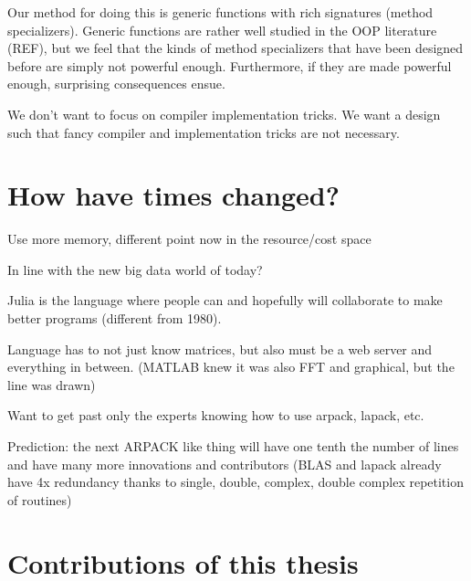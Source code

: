 Our method for doing this is generic functions with rich signatures
(method specializers). Generic functions are rather well studied in the
OOP literature (REF), but we feel that the kinds of method specializers
that have been designed before are simply not powerful enough.
Furthermore, if they are made powerful enough, surprising consequences
ensue.


We don't want to focus on compiler implementation tricks. We want a
design such that fancy compiler and implementation tricks are not necessary.


\section{How have times changed?}

Use more memory, different point now in the resource/cost space

In line with the new big data world of today?

Julia is the language where people can and hopefully will collaborate
to make better programs (different from 1980).

Language has to not just know matrices, but also must be a web server
and everything in between. (MATLAB knew it was also FFT and graphical,
but the line was drawn)

Want to get past only the experts knowing how to use arpack, lapack,
etc.

Prediction: the next ARPACK like thing will have one tenth the number
of lines and have many more innovations and contributors (BLAS and
lapack already have 4x redundancy thanks to single, double, complex,
double complex repetition of routines)

\section{Contributions of this thesis}
